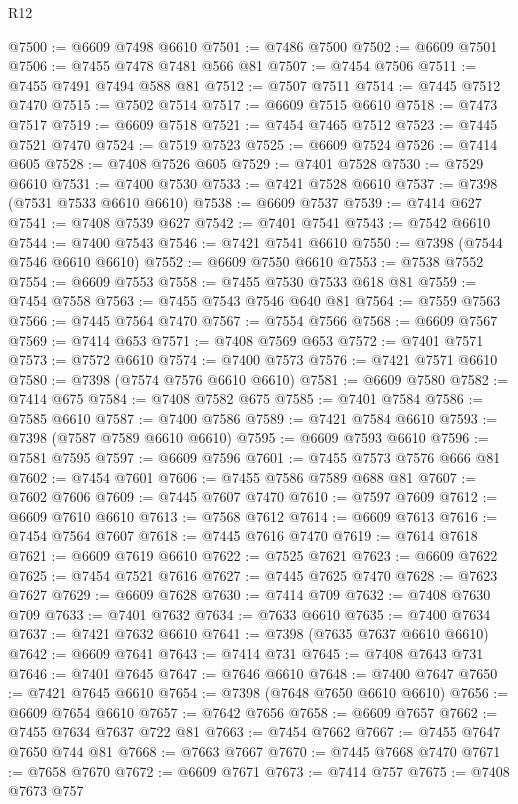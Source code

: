 \begin{lexlean}{R12}
\begin{coremodule}
{{{{{{{{{{{{{{{{{{{{{{{{{{{{{{{{{{{{{{{{{{{{{{{{{{{{{{{{{{{{{{{{{{{{{{{{{{{{{{{{{{@7500 := @6609 @7498 @6610
@7501 := @7486 @7500
@7502 := @6609 @7501
@7506 := @7455 @7478 @7481 @566 @81
@7507 := @7454 @7506
@7511 := @7455 @7491 @7494 @588 @81
@7512 := @7507 @7511
@7514 := @7445 @7512 @7470
@7515 := @7502 @7514
@7517 := @6609 @7515 @6610
@7518 := @7473 @7517
@7519 := @6609 @7518
@7521 := @7454 @7465 @7512
@7523 := @7445 @7521 @7470
@7524 := @7519 @7523
@7525 := @6609 @7524
@7526 := @7414 @605
@7528 := @7408 @7526 @605
@7529 := @7401 @7528
@7530 := @7529 @6610
@7531 := @7400 @7530
@7533 := @7421 @7528 @6610
@7537 := @7398 (@7531 @7533 @6610 @6610)
@7538 := @6609 @7537
@7539 := @7414 @627
@7541 := @7408 @7539 @627
@7542 := @7401 @7541
@7543 := @7542 @6610
@7544 := @7400 @7543
@7546 := @7421 @7541 @6610
@7550 := @7398 (@7544 @7546 @6610 @6610)
@7552 := @6609 @7550 @6610
@7553 := @7538 @7552
@7554 := @6609 @7553
@7558 := @7455 @7530 @7533 @618 @81
@7559 := @7454 @7558
@7563 := @7455 @7543 @7546 @640 @81
@7564 := @7559 @7563
@7566 := @7445 @7564 @7470
@7567 := @7554 @7566
@7568 := @6609 @7567
@7569 := @7414 @653
@7571 := @7408 @7569 @653
@7572 := @7401 @7571
@7573 := @7572 @6610
@7574 := @7400 @7573
@7576 := @7421 @7571 @6610
@7580 := @7398 (@7574 @7576 @6610 @6610)
@7581 := @6609 @7580
@7582 := @7414 @675
@7584 := @7408 @7582 @675
@7585 := @7401 @7584
@7586 := @7585 @6610
@7587 := @7400 @7586
@7589 := @7421 @7584 @6610
@7593 := @7398 (@7587 @7589 @6610 @6610)
@7595 := @6609 @7593 @6610
@7596 := @7581 @7595
@7597 := @6609 @7596
@7601 := @7455 @7573 @7576 @666 @81
@7602 := @7454 @7601
@7606 := @7455 @7586 @7589 @688 @81
@7607 := @7602 @7606
@7609 := @7445 @7607 @7470
@7610 := @7597 @7609
@7612 := @6609 @7610 @6610
@7613 := @7568 @7612
@7614 := @6609 @7613
@7616 := @7454 @7564 @7607
@7618 := @7445 @7616 @7470
@7619 := @7614 @7618
@7621 := @6609 @7619 @6610
@7622 := @7525 @7621
@7623 := @6609 @7622
@7625 := @7454 @7521 @7616
@7627 := @7445 @7625 @7470
@7628 := @7623 @7627
@7629 := @6609 @7628
@7630 := @7414 @709
@7632 := @7408 @7630 @709
@7633 := @7401 @7632
@7634 := @7633 @6610
@7635 := @7400 @7634
@7637 := @7421 @7632 @6610
@7641 := @7398 (@7635 @7637 @6610 @6610)
@7642 := @6609 @7641
@7643 := @7414 @731
@7645 := @7408 @7643 @731
@7646 := @7401 @7645
@7647 := @7646 @6610
@7648 := @7400 @7647
@7650 := @7421 @7645 @6610
@7654 := @7398 (@7648 @7650 @6610 @6610)
@7656 := @6609 @7654 @6610
@7657 := @7642 @7656
@7658 := @6609 @7657
@7662 := @7455 @7634 @7637 @722 @81
@7663 := @7454 @7662
@7667 := @7455 @7647 @7650 @744 @81
@7668 := @7663 @7667
@7670 := @7445 @7668 @7470
@7671 := @7658 @7670
@7672 := @6609 @7671
@7673 := @7414 @757
@7675 := @7408 @7673 @757
}}}}}}}}}}}}}}}}}}}}}}}}}}}}}}}}}}}}}}}}}}}}}}}}}}}}}}}}}}}}}}}}}}}}}}}}}}}}}}}}}}
\end{coremodule}
\end{lexlean}
